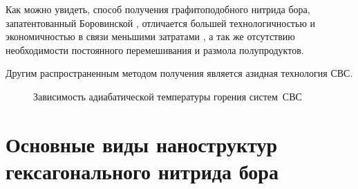 Как можно увидеть, способ получения графитоподобного нитрида бора,
запатентованный Боровинской \cite[]{__1999}, отличается большей технологичностью
и экономичностью в связи меньшими затратами , а так же отсутствию необходимости
постоянного перемешивания и размола полупродуктов.

Другим распространенным методом получения является азидная технология СВС.



\begin{figure}[ht]

 \caption{Зависимость адиабатической температуры горения систем~СВС}\label{fig:BN-SHS}
\end{figure}








\section{Основные виды наноструктур гексагонального нитрида бора}%
\label{sec:Основные виды наноструктур гексагонального нитрида бора}

